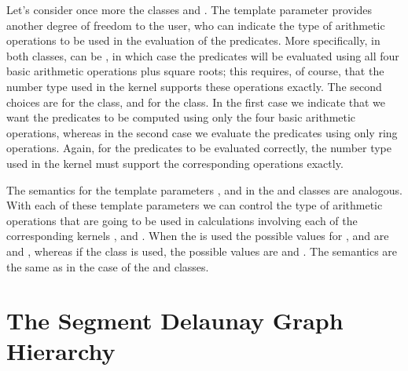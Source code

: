 Let's consider once more the classes
 and 
.
The template parameter  provides another degree of freedom
to the user, who can indicate the type of arithmetic operations to
be used in the evaluation of the predicates. More specifically, in
both classes,  can be , in
which case the predicates will be evaluated using all four basic
arithmetic operations plus square roots; this requires, of course,
that the number type used in the kernel  supports these
operations exactly. The second choices are  for
the  class, and
 for the
class. In the first case we indicate that we want the predicates to be
computed using only the four basic arithmetic operations, whereas in
the second case we evaluate the predicates using only ring operations.
Again, for the predicates to be evaluated correctly, the number type
used in the kernel  must support the corresponding operations
exactly.

The semantics for the template parameters ,  and
 in the
 and 
classes are analogous. With each of these template parameters we can
control the type of arithmetic operations that are going to be used in
calculations involving each of the corresponding kernels ,
 and . When the
 is
used the possible values for ,  and  are
 and , whereas if the 
class is used, the possible values are  and
. The semantics are the same as in the case of the 
 and 
 classes.






\section{The Segment Delaunay Graph Hierarchy\label{sec:sdg2-hierarchy}}


